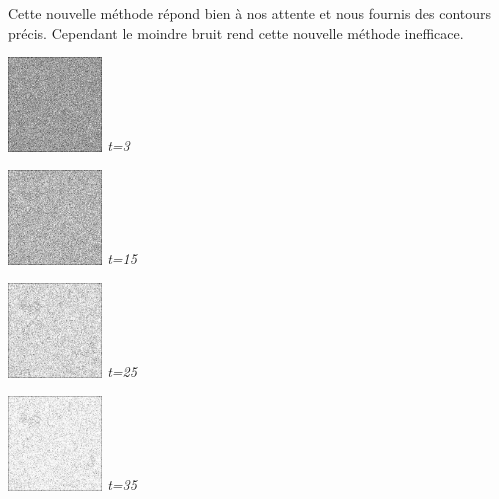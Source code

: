 \documentclass[a4,12pt]{article}
\begin{document}
Cette nouvelle méthode répond bien à nos attente et nous fournis des contours précis.
Cependant le moindre bruit rend cette nouvelle méthode inefficace.\\
\noindent
\begin{minipage}[c]{0.10\linewidth}
	\begin{center}
		\includegraphics[width = 25mm]{./img/p2test_grad_fin_globules10_t3.jpg}
		\textit{t=3}
	\end{center}
\end{minipage}
\begin{minipage}[c]{0.10\linewidth}
	\begin{center}
		\includegraphics[width = 25mm]{./img/p2test_grad_fin_globules10_t15.jpg}
		\textit{t=15}
	\end{center}
\end{minipage}
\begin{minipage}[c]{0.10\linewidth}
	\begin{center}
		\includegraphics[width = 25mm]{./img/p2test_grad_fin_globules10_t25.jpg}
		\textit{t=25}
	\end{center}
\end{minipage}
\begin{minipage}[c]{0.10\linewidth}
	\begin{center}
		\includegraphics[width = 25mm]{./img/p2test_grad_fin_globules10_t35.jpg}
		\textit{t=35}
	\end{center}
\end{minipage}
\end{document}
